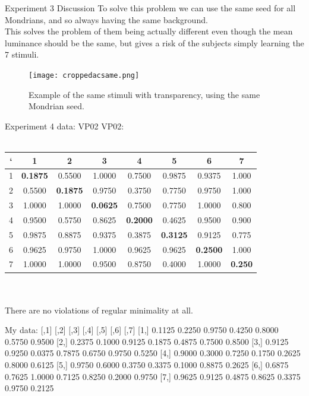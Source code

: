 \documentclass{beamer}
\begin{document}
\begin{frame}[t]{Experiment 3 Discussion}
To solve this problem we can use the same seed for all Mondrians, and so always having the same background. \\This solves the problem of them being actually different even though the mean luminance should be the same, but gives a risk of the subjects simply learning the 7 stimuli.\\

\begin{figure}[c]
\texttt{[image: croppedacsame.png]}
\caption{Example of the same stimuli with transparency, using the same Mondrian seed.}
\end{figure}

\end{frame}


\begin{frame}[t]{Experiment 4 data: VP02}
VP02:\\
~\\
\begin{tabular}{c | c c c c c c c}
` & 1 & 2 & 3 & 4 & 5 & 6 & 7 \\ \hline

1 & {\bf \color{red} 0.1875} & 0.5500 & 1.0000 & 0.7500 & 0.9875 & 0.9375 & 1.000 \\
2 & 0.5500& {\bf \color{red} 0.1875}& 0.9750& 0.3750& 0.7750& 0.9750& 1.000\\
3 & 1.0000& 1.0000& {\bf \color{red} 0.0625}& 0.7500& 0.7750& 1.0000& 0.800\\
4 & 0.9500& 0.5750& 0.8625& {\bf \color{red} 0.2000}& 0.4625& 0.9500& 0.900\\
5 & 0.9875& 0.8875& 0.9375& 0.3875& {\bf \color{red} 0.3125}& 0.9125& 0.775\\
6 & 0.9625& 0.9750& 1.0000& 0.9625& 0.9625& {\bf \color{red} 0.2500}& 1.000\\
7 & 1.0000& 1.0000& 0.9500& 0.8750& 0.4000& 1.0000& {\bf \color{red} 0.250}\\

\end{tabular}
\\
~\\
There are no violations of regular minimality at all.
\end{frame}


My data: 
       [,1]   [,2]   [,3]   [,4]   [,5]   [,6]   [,7]
[1,] 0.1125 0.2250 0.9750 0.4250 0.8000 0.5750 0.9500
[2,] 0.2375 0.1000 0.9125 0.1875 0.4875 0.7500 0.8500
[3,] 0.9125 0.9250 0.0375 0.7875 0.6750 0.9750 0.5250
[4,] 0.9000 0.3000 0.7250 0.1750 0.2625 0.8000 0.6125
[5,] 0.9750 0.6000 0.3750 0.3375 0.1000 0.8875 0.2625
[6,] 0.6875 0.7625 1.0000 0.7125 0.8250 0.2000 0.9750
[7,] 0.9625 0.9125 0.4875 0.8625 0.3375 0.9750 0.2125
\end{document}

